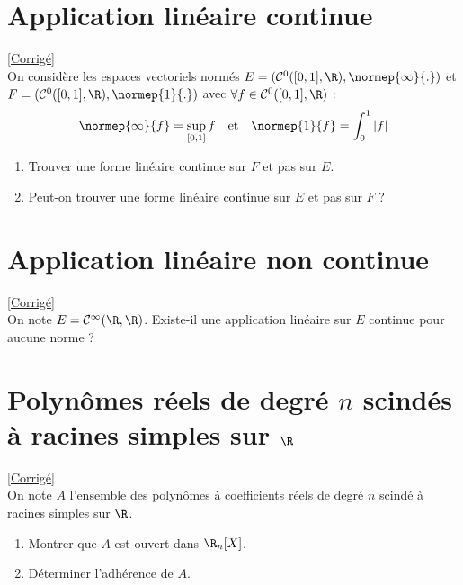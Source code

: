 \documentclass{book}
\begin{document}
\section{Application linéaire continue }
\label{Application linéaire continue}
\textcolor{blue}{\hyperref[sec:application-lineaire-continue]{[Corrigé]}}\\
On considère les espaces vectoriels normés $E=(\mathcal C^0([0,1],\R),\normep{\infty}{.})$ et $F=(\mathcal C^0([0,1],\R),\normep{1}{.})$ avec $\forall f\in \mathcal C^0([0,1],\R)$ :
$$\normep{\infty}{f}=\sup\limits_{[0,1]}f\quad\text{et}\quad \normep{1}{f}=\int_0^1|f|$$
\begin{enumerate}
	\item Trouver une forme linéaire continue sur $F$ et pas sur $E$.
	\item Peut-on trouver une forme linéaire continue sur $E$ et pas sur $F$ ?
\end{enumerate}

\section{Application linéaire non continue }
\label{Application linéaire non continue}
\textcolor{blue}{\hyperref[sec:application-lineaire-non-continue]{[Corrigé]}}\\
On note $E=\mathcal C^\infty(\R,\R)$. Existe-il une application linéaire sur $E$ continue pour aucune norme ?

\section{Polynômes réels de degré $n$ scindés à racines simples sur $\R$ }
\label{Polynômes réels de degré n scindés à racines simples sur R}
\textcolor{blue}{\hyperref[sec:polynomes-reels-de-degre-n-scindes-a-racines-simples-sur-r-etoile4]{[Corrigé]}}\\
On note $A$ l'ensemble des polynômes à coefficients réels de degré $n$ scindé à racines simples sur $\R$.
\begin{enumerate}
	\item Montrer que $A$ est ouvert dans $\R_n[X]$.
	\item Déterminer l'adhérence de $A$.
\end{enumerate}
\end{document}
